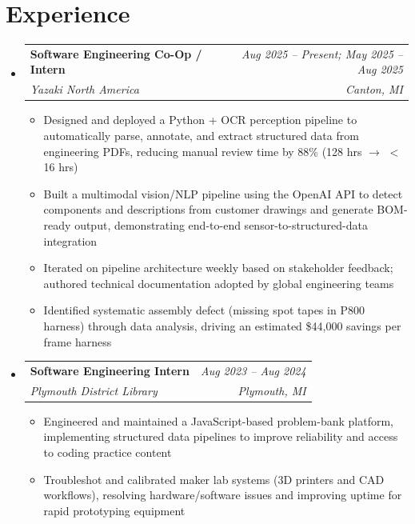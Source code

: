 \documentclass[letterpaper,11pt]{article}
\newcommand{\resumeItem}[1]{
  \item\small{
    {#1 \vspace{-2pt}}
  }
}
\newcommand{\resumeSubheading}[4]{
  \vspace{-2pt}\item
    \begin{tabularx}{0.97\textwidth}[t]{>{\raggedright\arraybackslash}X r}
      \textbf{#1} & \textit{\small #2} \\
      \textit{\small#3} & \textit{\small #4} \\
    \end{tabularx}\vspace{-7pt}
}
\newcommand{\resumeSubHeadingListStart}{\begin{itemize}[leftmargin=0.15in, label={}]}
\newcommand{\resumeSubHeadingListEnd}{\end{itemize}}
\newcommand{\resumeItemListStart}{\begin{itemize}}
\newcommand{\resumeItemListEnd}{\end{itemize}\vspace{-5pt}}
\begin{document}
\section{Experience}
  \resumeSubHeadingListStart

    \resumeSubheading
      {Software Engineering Co-Op / Intern}{Aug 2025 -- Present; May 2025 -- Aug 2025}
      {Yazaki North America}{Canton, MI}
      \resumeItemListStart
        \resumeItem{Designed and deployed a Python + OCR perception pipeline to automatically parse, annotate, and extract structured data from engineering PDFs, reducing manual review time by 88\% (128 hrs $\to$ $<$16 hrs)}
        \resumeItem{Built a multimodal vision/NLP pipeline using the OpenAI API to detect components and descriptions from customer drawings and generate BOM-ready output, demonstrating end-to-end sensor-to-structured-data integration}
        \resumeItem{Iterated on pipeline architecture weekly based on stakeholder feedback; authored technical documentation adopted by global engineering teams}
        \resumeItem{Identified systematic assembly defect (missing spot tapes in P800 harness) through data analysis, driving an estimated \$44,000 savings per frame harness}
      \resumeItemListEnd

    \resumeSubheading
      {Software Engineering Intern}{Aug 2023 -- Aug 2024}
      {Plymouth District Library}{Plymouth, MI}
      \resumeItemListStart
        \resumeItem{Engineered and maintained a JavaScript-based problem-bank platform, implementing structured data pipelines to improve reliability and access to coding practice content}
        \resumeItem{Troubleshot and calibrated maker lab systems (3D printers and CAD workflows), resolving hardware/software issues and improving uptime for rapid prototyping equipment}
    \resumeItemListEnd
  \resumeSubHeadingListEnd


\end{document}

